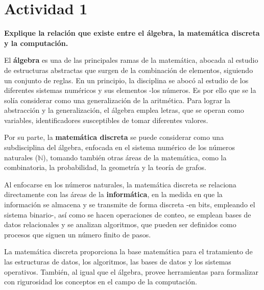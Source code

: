 \section*{Actividad 1}
\textbf{Explique la relación que existe entre el álgebra, la matemática discreta y la computación.}

El \textbf{álgebra} es una de las principales ramas de la matemática, abocada al estudio de estructuras abstractas que surgen de la combinación de elementos, siguiendo un conjunto de reglas. En un principio, la disciplina se abocó al estudio de los diferentes sistemas numéricos y sus elementos -los números. Es por ello que se la solía considerar como una generalización de la aritmética. Para lograr la abstracción y la generalización, el álgebra emplea letras, que se operan como variables, identificadores susceptibles de tomar diferentes valores. 

Por su parte, la \textbf{matemática discreta} se puede considerar como una subdisciplina del álgebra, enfocada en el sistema numérico de los números naturales ($\mathbb{N}$), tomando también otras áreas de la matemática, como la combinatoria, la probabilidad, la geometría y la teoría de grafos. 

Al enfocarse en los números naturales, la matemática discreta se relaciona directamente con las áreas de la \textbf{informática}, en la medida en que la información se almacena y se transmite de forma discreta -en bits, empleando el sistema binario-, así como se hacen operaciones de conteo, se emplean bases de datos relacionales y se analizan algoritmos, que pueden ser definidos como procesos que siguen un número finito de pasos. 

La matemática discreta proporciona la base matemática para el tratamiento de las estructuras de datos, los algoritmos, las bases de datos y los sistemas operativos. También, al igual que el álgebra, provee herramientas para formalizar con rigurosidad los conceptos en el campo de la computación.
